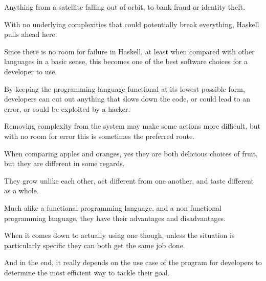 \documentclass{article}
\begin{document}
\medskip\noindent
Anything from a satellite falling out of orbit, to bank fraud or identity theft. 

\medskip\noindent
With no underlying complexities that could potentially break everything, Haskell pulls ahead here.

\medskip\noindent
Since there is no room for failure in Haskell, at least when compared with other languages in a basic sense, this becomes one of the best software choices for a developer to use.

\medskip\noindent
By keeping the programming language functional at its lowest possible form, developers can cut out anything that slows down the code, or could lead to an error, or could be exploited by a hacker.

\medskip\noindent
Removing complexity from the system may make some actions more difficult, but with no room for error this is sometimes the preferred route.

\medskip\noindent
When comparing apples and oranges, yes they are both delicious choices of fruit, but they are different in some regards.

\medskip\noindent
They grow unlike each other, act different from one another, and taste different as a whole.

\medskip\noindent
Much alike a functional programming language, and a non functional programming language, they have their advantages and disadvantages.

\medskip\noindent
When it comes down to actually using one though, unless the situation is particularly specific they can both get the same job done.

\medskip\noindent
And in the end, it really depends on the use case of the program for developers to determine the most efficient way to tackle their goal.
\end{document}
